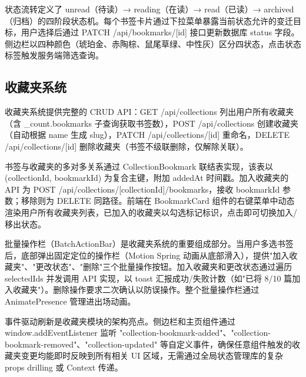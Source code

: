 \documentclass[a4paper,12pt]{ctexart}
\begin{document}
状态流转定义了 unread（待读）→ reading（在读）→ read（已读）→ archived（归档）的四阶段状态机。每个书签卡片通过下拉菜单暴露当前状态允许的变迁目标，用户选择后通过 PATCH /api/bookmarks/[id] 接口更新数据库 status 字段。侧边栏以四种颜色（琥珀金、赤陶棕、鼠尾草绿、中性灰）区分四状态，点击状态标签触发服务端筛选查询。


\subsection{收藏夹系统}

收藏夹系统提供完整的 CRUD API：GET /api/collections 列出用户所有收藏夹（含 _count.bookmarks 子查询获取书签数），POST /api/collections 创建收藏夹（自动根据 name 生成 slug），PATCH /api/collections/[id] 重命名，DELETE /api/collections/[id] 删除收藏夹（书签不级联删除，仅解除关联）。

书签与收藏夹的多对多关系通过 CollectionBookmark 联结表实现，该表以 (collectionId, bookmarkId) 为复合主键，附加 addedAt 时间戳。加入收藏夹的 API 为 POST /api/collections/[collectionId]/bookmarks，接收 bookmarkId 参数；移除则为 DELETE 同路径。前端在 BookmarkCard 组件的右键菜单中动态渲染用户所有收藏夹列表，已加入的收藏夹以勾选标记标识，点击即可切换加入/移出状态。

批量操作栏（BatchActionBar）是收藏夹系统的重要组成部分。当用户多选书签后，底部弹出固定定位的操作栏（Motion Spring 动画从底部滑入），提供"加入收藏夹"、"更改状态"、"删除"三个批量操作按钮。加入收藏夹和更改状态通过遍历 selectedIds 并发调用 API 实现，以 toast 汇报成功/失败计数（如"已将 8/10 篇加入收藏夹"）。删除操作要求二次确认以防误操作。整个批量操作栏通过 AnimatePresence 管理进出场动画。

事件驱动刷新是收藏夹模块的架构亮点。侧边栏和主页组件通过 window.addEventListener 监听 "collection-bookmark-added"、"collection-bookmark-removed"、"collection-updated" 等自定义事件，确保任意组件触发的收藏夹变更均能即时反映到所有相关 UI 区域，无需通过全局状态管理库的复杂 props drilling 或 Context 传递。

\end{document}

